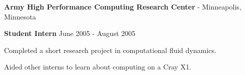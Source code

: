 {\textbf{Army High Performance Computing Research Center} - Minneapolis, Minnesota
\begin{outerlist}
\item[] \textbf{Student Intern} \hfill June 2005 - August 2005
\begin{innerlist}
 \item Completed a short research project in computational fluid dynamics. 
 \item Aided other interns to learn about computing on a Cray X1. 
\end{innerlist}
\end{outerlist}
}

\newcommand{\myretailjobs}
{
\href{http://www.bookstore.mtu.edu/michtech2}{\textbf{University Images}} - Houghton, Michigan
\begin{outerlist}
\item[] \textbf{Sales Clerk} \hfill  November 2002 - January 2003
 \begin{innerlist}
  \item Operated a cash register, assisted with inventory, and closed the store.
 \end{innerlist}
\end{outerlist}
}

\newcommand{\mypublications}{\begin{bibsection} \end{bibsection} }

\newcommand{\mypresentations}
{
\begin{outerlist}
\item[] \textit{The FFTW and NVIDIA CUDA CUFFT Libraries}
\begin{innerlist}
\item[] Lecture in CS5331: Parallel Algorithms, Michigan Technological University (2009)
\end{innerlist}
\item[] \textit{Effect of Fractal Dimension in a Nanoparticle Growth Simulation}
\begin{innerlist}
\item[] Final Presentation, Summer Institute 2005, AHPCRC (2005)
\end{innerlist}
\end{outerlist}
}

